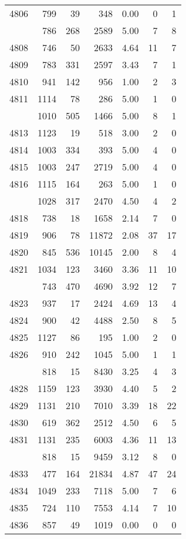 \documentclass[
]{article}
\begin{document}
\begin{table}
\begin{tabular}[t]{lrrrrrr}
4806 & 799 & 39 & 348 & 0.00 & 0 & 1\\
\addlinespace
4807 & 786 & 268 & 2589 & 5.00 & 7 & 8\\
4808 & 746 & 50 & 2633 & 4.64 & 11 & 7\\
4809 & 783 & 331 & 2597 & 3.43 & 7 & 1\\
4810 & 941 & 142 & 956 & 1.00 & 2 & 3\\
4811 & 1114 & 78 & 286 & 5.00 & 1 & 0\\
\addlinespace
4812 & 1010 & 505 & 1466 & 5.00 & 8 & 1\\
4813 & 1123 & 19 & 518 & 3.00 & 2 & 0\\
4814 & 1003 & 334 & 393 & 5.00 & 4 & 0\\
4815 & 1003 & 247 & 2719 & 5.00 & 4 & 0\\
4816 & 1115 & 164 & 263 & 5.00 & 1 & 0\\
\addlinespace
4817 & 1028 & 317 & 2470 & 4.50 & 4 & 2\\
4818 & 738 & 18 & 1658 & 2.14 & 7 & 0\\
4819 & 906 & 78 & 11872 & 2.08 & 37 & 17\\
4820 & 845 & 536 & 10145 & 2.00 & 8 & 4\\
4821 & 1034 & 123 & 3460 & 3.36 & 11 & 10\\
\addlinespace
4822 & 743 & 470 & 4690 & 3.92 & 12 & 7\\
4823 & 937 & 17 & 2424 & 4.69 & 13 & 4\\
4824 & 900 & 42 & 4488 & 2.50 & 8 & 5\\
4825 & 1127 & 86 & 195 & 1.00 & 2 & 0\\
4826 & 910 & 242 & 1045 & 5.00 & 1 & 1\\
\addlinespace
4827 & 818 & 15 & 8430 & 3.25 & 4 & 3\\
4828 & 1159 & 123 & 3930 & 4.40 & 5 & 2\\
4829 & 1131 & 210 & 7010 & 3.39 & 18 & 22\\
4830 & 619 & 362 & 2512 & 4.50 & 6 & 5\\
4831 & 1131 & 235 & 6003 & 4.36 & 11 & 13\\
\addlinespace
4832 & 818 & 15 & 9459 & 3.12 & 8 & 0\\
4833 & 477 & 164 & 21834 & 4.87 & 47 & 24\\
4834 & 1049 & 233 & 7118 & 5.00 & 7 & 6\\
4835 & 724 & 110 & 7553 & 4.14 & 7 & 10\\
4836 & 857 & 49 & 1019 & 0.00 & 0 & 0\\

\end{tabular}
\end{table}
\end{document}
